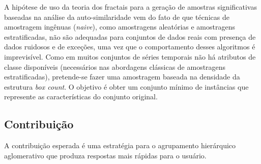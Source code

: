 A hipótese de uso da teoria dos fractais para a geração de amostras
significativas baseadas na análise da auto-similaridade vem do fato de que técnicas de amostragem ingênuas (\textit{naive}), como amostragens aleatórias e amostragens estratificadas, não são adequadas para conjuntos de dados reais com presença de dados ruidosos e de exceções, uma vez que o comportamento desses algoritmos é imprevisível. Como em muitos conjuntos de séries temporais não há atributos de classe disponíveis (necessários nas abordagens clássicas de amostragens estratificadas), pretende-se fazer uma amostragem baseada na densidade da estrutura \textit{box count}. O objetivo é obter um conjunto mínimo de instâncias que represente as características do conjunto original.

\subsection{Contribuição}
	\label{subsec:contribuicao}

A contribuição esperada é uma estratégia para o agrupamento hierárquico
aglomerativo que produza respostas mais rápidas para o usuário.

